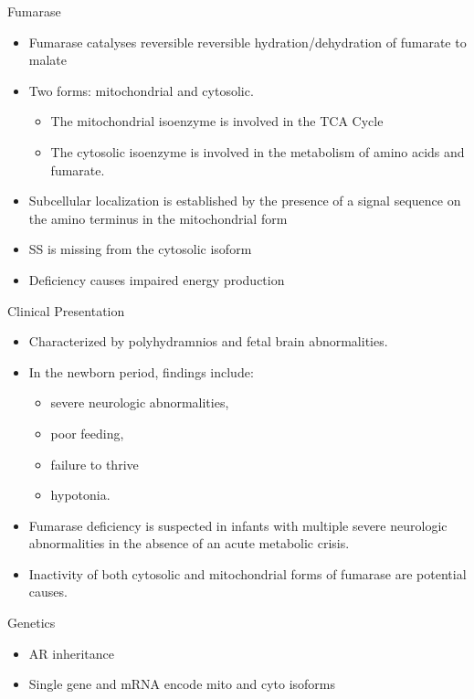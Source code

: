 \documentclass[presentation, smaller]{beamer}
\begin{document}
\begin{frame}[label={sec:org4f692c0}]{Fumarase}
\begin{itemize}
\item Fumarase catalyses reversible reversible hydration/dehydration of fumarate to malate
\item Two forms: mitochondrial and cytosolic.
\begin{itemize}
\item The mitochondrial isoenzyme is involved in the TCA Cycle
\item The cytosolic isoenzyme is involved in the metabolism of amino acids and fumarate.
\end{itemize}
\item Subcellular localization is established by the presence of a signal
sequence on the amino terminus in the mitochondrial form
\item SS is missing from the cytosolic isoform
\item Deficiency causes impaired energy production
\end{itemize}
\end{frame}

\begin{frame}[label={sec:org2318b52}]{Clinical Presentation}
\begin{itemize}
\item Characterized by polyhydramnios and fetal brain abnormalities.
\item In the newborn period, findings include:
\begin{itemize}
\item severe neurologic abnormalities,
\item poor feeding,
\item failure to thrive
\item hypotonia.
\end{itemize}
\item Fumarase deficiency is suspected in infants with multiple severe
neurologic abnormalities in the absence of an acute metabolic
crisis.

\item Inactivity of both cytosolic and mitochondrial forms of
fumarase are potential causes.
\end{itemize}
\end{frame}

\begin{frame}[label={sec:orge6b56ab}]{Genetics}
\begin{itemize}
\item AR inheritance
\item Single gene and mRNA encode mito and cyto isoforms
\end{itemize}
\end{frame}
\end{document}
